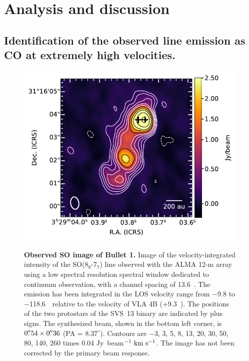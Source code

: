 \documentclass[12pt]{mythesis}
\begin{document}
\section{Analysis and discussion}

\subsection[Identification of the observed line emission as CO at EHV]{Identification of the observed line emission as CO at extremely high velocities.}
% 
\begin{figure}[p!] 
\begin{center}
\includegraphics[width=\textwidth]{figures/SO.pdf}\\
\caption[Observed SO image of Bullet 1]{{\bf Observed SO image of Bullet 1.}
Image of the velocity-integrated intensity of the SO(8$_8$-7$_7$) line observed with the ALMA 12-m array using a low spectral resolution spectral window dedicated to continuum observation, with a channel spacing of 13.6~\kms. The emission has been integrated in the LOS velocity range from $-$9.8 to $-$118.6~\kms\ relative to the velocity of VLA 4B ($+$9.3~\kms). The positions of the two protostars of the SVS~13 binary \citep{anglada2000} are indicated by plus signs. The synthesized beam, shown in the bottom left corner, is $0\mbox{$.\!\!^{\prime\prime}$}54 \times 0\mbox{$.\!\!^{\prime\prime}$}36$ (PA = $8.37^\circ$). Contours are $-$3, 3, 5, 8, 13, 20, 30, 50, 80, 140, 260 times 0.04 Jy~beam$^{-1}~\mbox{km s$^{-1}$}$. The image has not been corrected by the primary beam response.
}
\end{center}
\end{figure}
\end{document}

